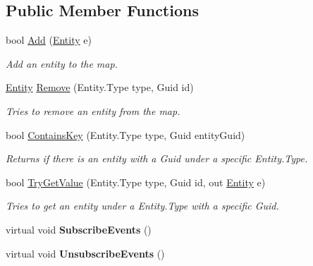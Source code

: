 \subsection*{Public Member Functions}
\begin{DoxyCompactItemize}
\item 
bool \hyperlink{class_skyrates_1_1_common_1_1_entity_1_1_entity_tracker_a3e4907b3ba1a4a4faab86e61e6552d08}{Add} (\hyperlink{class_skyrates_1_1_common_1_1_entity_1_1_entity}{Entity} e)
\begin{DoxyCompactList}\small\item\em Add an entity to the map. \end{DoxyCompactList}\item 
\hyperlink{class_skyrates_1_1_common_1_1_entity_1_1_entity}{Entity} \hyperlink{class_skyrates_1_1_common_1_1_entity_1_1_entity_tracker_a5648dd292074dd7f3d71b6ce98414c90}{Remove} (Entity.\-Type type, Guid id)
\begin{DoxyCompactList}\small\item\em Tries to remove an entity from the map. \end{DoxyCompactList}\item 
bool \hyperlink{class_skyrates_1_1_common_1_1_entity_1_1_entity_tracker_afda1681d6191f1ea165f81d32dfdb3bd}{Contains\-Key} (Entity.\-Type type, Guid entity\-Guid)
\begin{DoxyCompactList}\small\item\em Returns if there is an entity with a Guid under a specific Entity.\-Type. \end{DoxyCompactList}\item 
bool \hyperlink{class_skyrates_1_1_common_1_1_entity_1_1_entity_tracker_a0cdadea63f872b1873a92de48641edb5}{Try\-Get\-Value} (Entity.\-Type type, Guid id, out \hyperlink{class_skyrates_1_1_common_1_1_entity_1_1_entity}{Entity} e)
\begin{DoxyCompactList}\small\item\em Tries to get an entity under a Entity.\-Type with a specific Guid. \end{DoxyCompactList}\item 
\hypertarget{class_skyrates_1_1_common_1_1_entity_1_1_entity_tracker_a19f29ff614d869cf044ceaa5b4a24fe0}{virtual void {\bfseries Subscribe\-Events} ()}\label{class_skyrates_1_1_common_1_1_entity_1_1_entity_tracker_a19f29ff614d869cf044ceaa5b4a24fe0}

\item 
\hypertarget{class_skyrates_1_1_common_1_1_entity_1_1_entity_tracker_ac8f5c479c4f141ff2f3e2ccb68e26edc}{virtual void {\bfseries Unsubscribe\-Events} ()}\label{class_skyrates_1_1_common_1_1_entity_1_1_entity_tracker_ac8f5c479c4f141ff2f3e2ccb68e26edc}


\end{DoxyCompactItemize}

